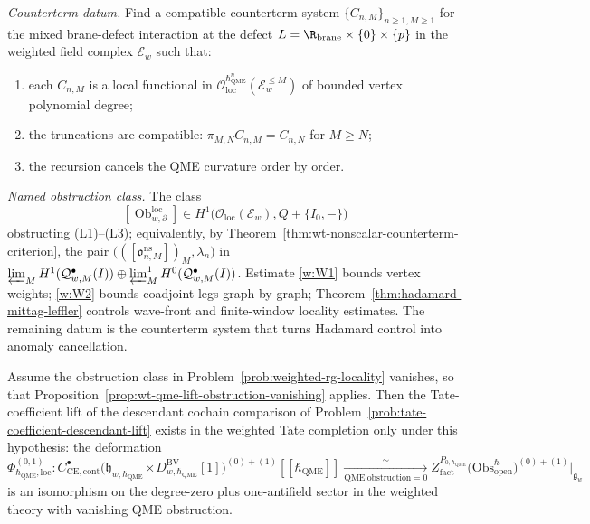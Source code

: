 \begin{prob}\label{prob:weighted-rg-locality}
  \emph{Counterterm datum.}  Find a compatible counterterm
  system $\{C_{n,M}\}_{n\geq1,M\geq1}$ for the mixed brane-defect
  interaction at the defect
  $L=\R_{\mathrm{brane}}\times\{0\}\times\{p\}$ in the weighted field
  complex $\mathcal E_w$ such that:
  \begin{enumerate}[label=(L\arabic*)]
    \item each $C_{n,M}$ is a local functional in
      $\mathcal O_{\mathrm{loc}}^{\hbar_{\mathrm{QME}}^n}(\mathcal E_w^{\leq M})$ of
      bounded vertex polynomial degree;
    \item the truncations are compatible:
      $\pi_{M,N}C_{n,M}=C_{n,N}$ for $M\geq N$;
    \item the recursion cancels the QME curvature order by order.
  \end{enumerate}
  \emph{Named obstruction class.}  The class
  \[
    [\operatorname{Ob}^{\mathrm{loc}}_{w,\partial}]
      \in
      H^1\bigl(\mathcal O_{\mathrm{loc}}(\mathcal E_w),
        Q+\{I_0,-\}\bigr)
  \]
  obstructing (L1)--(L3); equivalently, by
  Theorem~\ref{thm:wt-nonscalar-counterterm-criterion}, the pair
  \(\bigl(([\mathfrak o^{\mathrm{ns}}_{n,M}])_M,\lambda_n\bigr)\)
  in
  \(\varprojlim_M H^1(\mathcal Q^\bullet_{w,M}(I))\oplus
  \varprojlim^1_M H^0(\mathcal Q^\bullet_{w,M}(I))\).
  Estimate \ref{w:W1} bounds vertex weights;
  \ref{w:W2} bounds coadjoint legs graph by graph;
  Theorem~\ref{thm:hadamard-mittag-leffler} controls wave-front and
  finite-window locality estimates.  The remaining datum is the
  counterterm system that turns Hadamard control into anomaly
  cancellation.
\end{prob}

\begin{cor}\label{cor:wt-descendant-qme-vanishing}
  Assume the obstruction class in
  Problem~\ref{prob:weighted-rg-locality} vanishes, so that
  Proposition~\ref{prop:wt-qme-lift-obstruction-vanishing} applies.  Then the
  Tate-coefficient lift of the descendant cochain comparison of
  Problem~\ref{prob:tate-coefficient-descendant-lift} exists in the
  weighted Tate completion only under this hypothesis: the deformation
  $$\Phi_{\hbar_{\mathrm{QME}},\mathrm{loc}}^{(0,1)}\colon
    C^\bullet_{\mathrm{CE},\mathrm{cont}}\bigl(
    \mathfrak h_{w,\hbar_{\mathrm{QME}}}\ltimes D^{\mathrm{BV}}_{w,\hbar_{\mathrm{QME}}}[1]
    \bigr)^{(0)+(1)}[[\hbar_{\mathrm{QME}}]]
    \xrightarrow[\mathrm{QME\ obstruction}=0]{\sim}
    Z^{P_{0,\hbar_{\mathrm{QME}}}}_{\mathrm{fact}}\bigl(\mathrm{Obs}^\hbar_{\mathrm{open}}
    \bigr)^{(0)+(1)}|_{\mathfrak g_w}$$
  is an isomorphism on the degree-zero plus one-antifield sector in the
  weighted theory with vanishing QME obstruction.
\end{cor}


